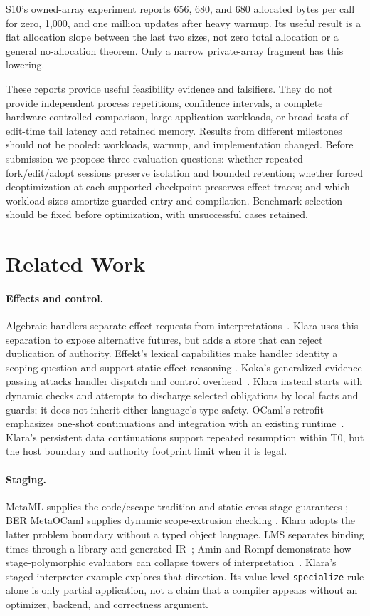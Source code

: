 \documentclass[acmsmall,screen,review,nonacm]{acmart}
\newcommand{\src}[1]{{\normalfont\nolinkurl{#1}}}
\begin{document}
S10's owned-array experiment reports 656, 680, and 680 allocated bytes per call
for zero, 1,000, and one million updates after heavy warmup. Its useful result
is a flat allocation slope between the last two sizes, not zero total
allocation or a general no-allocation theorem. Only a narrow private-array
fragment has this lowering.

These reports provide useful feasibility evidence and falsifiers. They do
not provide independent process repetitions, confidence intervals, a complete
hardware-controlled comparison, large application workloads, or broad tests
of edit-time tail latency and retained memory. Results from different
milestones should not be pooled: workloads, warmup, and implementation changed.
Before submission we propose three evaluation questions: whether repeated
fork/edit/adopt sessions preserve isolation and bounded retention; whether
forced deoptimization at each supported checkpoint preserves effect traces;
and which workload sizes amortize guarded entry and compilation. Benchmark
selection should be fixed before optimization, with unsuccessful cases retained.

\section{Related Work}
\paragraph{Effects and control.}
Algebraic handlers separate effect requests from interpretations~\cite{plotkin2009}.
Klara uses this separation to expose alternative futures, but adds a store
that can reject duplication of authority. Effekt's lexical capabilities make
handler identity a scoping question and support static effect reasoning
\cite{effekt2020}. Koka's generalized evidence passing attacks handler dispatch
and control overhead~\cite{koka2021}. Klara instead starts with dynamic checks
and attempts to discharge selected obligations by local facts and guards;
it does not inherit either language's type safety. OCaml's retrofit emphasizes
one-shot continuations and integration with an existing runtime~\cite{ocaml2021}.
Klara's persistent data continuations support repeated resumption within T0,
but the host boundary and authority footprint limit when it is legal.

\paragraph{Staging.}
MetaML supplies the code/escape tradition and static cross-stage guarantees
\cite{metaml2000}; BER MetaOCaml supplies dynamic scope-extrusion checking
\cite{ber2014}. Klara adopts the latter problem boundary without a typed
object language. LMS separates binding times through a library and generated
IR~\cite{lms2010}; Amin and Rompf demonstrate how stage-polymorphic evaluators
can collapse towers of interpretation~\cite{amin2018}. Klara's staged
interpreter example explores that direction. Its value-level \src{specialize}
rule alone is only partial application, not a claim that a compiler appears
without an optimizer, backend, and correctness argument.
\end{document}
